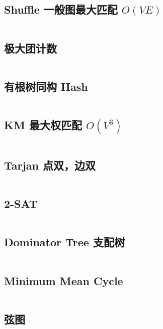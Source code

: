 \documentclass[titlepage, a4paper]{article}
\newcommand\nothing{}
\renewcommand{\checkmark}[0]{\nothing}
\begin{document}
\begin{multicols}{2}
\begin{spacing}{0.6}
				\subsection{Shuffle 一般图最大匹配 $O(V E)$\checkmark}
				\inputminted{cpp}{src/TreeandGraph/一般图最大匹配-shuffle.cpp}
				\subsection{极大团计数\checkmark}
				\inputminted{cpp}{src/TreeandGraph/CliqueCount.cpp}
				\subsection{有根树同构 Hash\checkmark}
				\inputminted{cpp}{src/TreeandGraph/TreeHash.cpp}
				\subsection{KM 最大权匹配 $O(V^3)$}
				\inputminted{cpp}{src/TreeandGraph/KM.cpp}
				\subsection{Tarjan 点双，边双}
				\inputminted{cpp}{src/TreeandGraph/Tarjan.cpp}
				\subsection{2-SAT\checkmark}
				\inputminted{cpp}{src/TreeandGraph/2-sat.cpp}
				\subsection{Dominator Tree 支配树\checkmark}
				\inputminted{cpp}{src/TreeandGraph/支配树.cpp}
				\subsection{Minimum Mean Cycle}
				\inputminted{cpp}{src/TreeandGraph/MeanCycle.cpp}
				\subsection{弦图\checkmark}
				
				\inputminted{cpp}{src/TreeandGraph/弦图.cpp}

\end{spacing}
\end{multicols}
\end{document}
